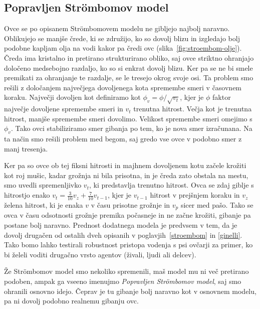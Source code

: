 \subsection{Popravljen Strömbomov model}\label{popravljen}

Ovce se po opisanem Str{\"o}mbomovem modelu ne gibljejo najbolj naravno. Oblikujejo se manjše črede, ki se združijo, ko so dovolj blizu in izgledajo bolj podobne kapljam olja na vodi kakor pa čredi ovc (slika~\ref{fig:stroembom-olje}). Čreda ima kristalno in pretirano strukturirano obliko, saj ovce striktno ohranjajo določeno medsebojno razdaljo, ko so si enkrat dovolj blizu. Ker pa se ne bi smele premikati za ohranjanje te razdalje, se le tresejo okrog svoje osi. Ta problem smo rešili z določanjem največjega dovoljenega kota spremembe smeri v časovnem koraku. Največji dovoljen kot definiramo kot $\phi_v = \phi / \sqrt{v_t}$, kjer je $\phi$ faktor največje dovoljene spremembe smeri in $v_t$ trenutna hitrost. Večja kot je trenutna hitrost, manjše spremembe smeri dovolimo. Velikost spremembe smeri omejimo s $\phi_v$. Tako ovci stabiliziramo smer gibanja po tem, ko je nova smer izračunana. Na ta način smo rešili problem med begom, saj gredo vse ovce v podobno smer z manj tresenja.

Ker pa so ovce ob tej fiksni hitrosti in majhnem dovoljenem kotu začele krožiti kot roj mušic, kadar grožnja ni bila prisotna, in je čreda zato obstala na mestu, smo uvedli spremenljivko $v_t$, ki predstavlja trenutno hitrost. Ovca se zdaj giblje s hitrostjo enako $v_t = \frac{3}{10}v_z + \frac{7}{10}v_{t-1}$, kjer je $v_{t-1}$ hitrost v prejšnjem koraku in $v_z$ želena hitrost, ki je enaka $v$ v času prisotne grožnje in $v_p$ sicer med pašo. Tako se ovca v času odsotnosti grožnje premika počasneje in ne začne krožiti, gibanje pa postane bolj naravno. Prednost dodatnega modela je predvsem v tem, da je dovolj drugačen od ostalih dveh opisanih v poglavjih~\ref{stroembom} in \ref{ginelli}. Tako bomo lahko testirali robustnost pristopa vodenja s psi ovčarji za primer, ko bi želeli voditi drugačno vrsto agentov (živali, ljudi ali delcev).

Že Str{\"o}mbomov model smo nekoliko spremenili, maš model mu ni več pretirano podoben, ampak ga vseeno imenujmo \textit{Popravljen Str{\"o}mbomov model}, saj smo ohranili osnovno idejo. Čeprav je tu gibanje bolj naravno kot v osnovnem modelu, pa ni dovolj podobno realnemu gibanju ovc.

